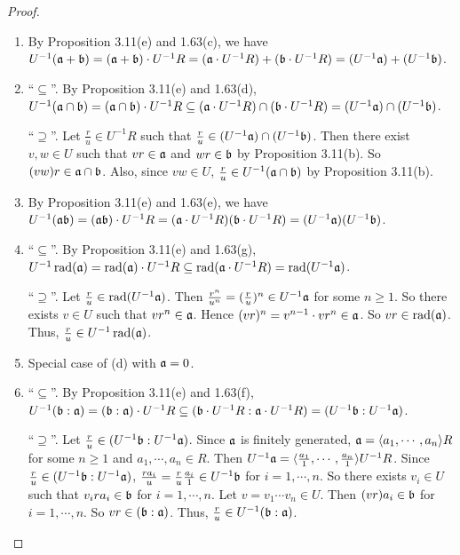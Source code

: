 \begin{proof}
    \begin{enumerate}
        \item By Proposition 3.11(e) and 1.63(c), we have $U^{-1}(\mathfrak{a}+\mathfrak{b}) = (\mathfrak{a}+\mathfrak{b}) \cdot U^{-1}R = (\mathfrak{a} \cdot U^{-1}R) + (\mathfrak{b} \cdot U^{-1}R) = (U^{-1}\mathfrak{a}) + (U^{-1}\mathfrak{b})$.
        \item ``$\subseteq$''. By Proposition 3.11(e) and 1.63(d), $U^{-1}(\mathfrak{a} \cap \mathfrak{b}) = (\mathfrak{a} \cap \mathfrak{b}) \cdot U^{-1}R \subseteq (\mathfrak{a} \cdot U^{-1}R) \cap (\mathfrak{b} \cdot U^{-1}R) = (U^{-1}\mathfrak{a}) \cap (U^{-1}\mathfrak{b})$. \par 
            ``$\supseteq$''. Let $\frac{r}{u} \in U^{-1}R$ such that $\frac{r}{u} \in (U^{-1}\mathfrak{a}) \cap (U^{-1}\mathfrak{b})$. Then there exist $v,w \in U$ such that $vr \in \mathfrak{a}$ and $wr \in \mathfrak{b}$ by Proposition 3.11(b). So $(vw)r \in \mathfrak{a} \cap \mathfrak{b}$. Also, since $vw \in U$, $\frac{r}{u} \in U^{-1}(\mathfrak{a} \cap \mathfrak{b})$ by Proposition 3.11(b). 
        \item By Proposition 3.11(e) and 1.63(e), we have $U^{-1}(\mathfrak{a}\mathfrak{b}) = (\mathfrak{a}\mathfrak{b}) \cdot U^{-1}R = (\mathfrak{a} \cdot U^{-1}R)(\mathfrak{b} \cdot U^{-1}R) = (U^{-1}\mathfrak{a})(U^{-1}\mathfrak{b})$.
        \item ``$\subseteq$''. By Proposition 3.11(e) and 1.63(g), $U^{-1} \operatorname{rad}(\mathfrak{a}) = \operatorname{rad}(\mathfrak{a}) \cdot U^{-1}R \subseteq \operatorname{rad}(\mathfrak{a} \cdot U^{-1}R) = \operatorname{rad}(U^{-1}\mathfrak{a})$. \par 
            ``$\supseteq$''. Let $\frac{r}{u} \in \operatorname{rad}(U^{-1}\mathfrak{a})$. Then $\frac{r^{n}}{u^{n}} = (\frac{r}{u})^{n} \in U^{-1}\mathfrak{a}$ for some $n \geq 1$. So there exists $v \in U$ such that $vr^{n} \in \mathfrak{a}$. Hence $(vr)^{n} = v^{n-1} \cdot vr^{n} \in \mathfrak{a}$. So $vr \in \operatorname{rad}(\mathfrak{a})$. Thus, $\frac{r}{u} \in U^{-1} \operatorname{rad}(\mathfrak{a})$.
        \item Special case of (d) with $\mathfrak{a} = 0$. 
        \item ``$\subseteq$''. By Proposition 3.11(e) and 1.63(f), $U^{-1}(\mathfrak{b}:\mathfrak{a}) = (\mathfrak{b}:\mathfrak{a}) \cdot U^{-1}R \subseteq (\mathfrak{b} \cdot U^{-1}R: \mathfrak{a} \cdot U^{-1}R) = (U^{-1}\mathfrak{b}:U^{-1}\mathfrak{a})$. \par 
            ``$\supseteq$''. Let $\frac{r}{u} \in (U^{-1}\mathfrak{b}:U^{-1}\mathfrak{a})$. Since $\mathfrak{a}$ is finitely generated, $\mathfrak{a} = \langle a_{1},\cdots,a_{n} \rangle R$ for some $n \geq 1$ and $a_{1},\cdots,a_{n} \in R$. Then $U^{-1}\mathfrak{a} = \langle \frac{a_{1}}{1},\cdots,\frac{a_{n}}{1} \rangle U^{-1}R$. Since $\frac{r}{u} \in (U^{-1}\mathfrak{b}:U^{-1}\mathfrak{a})$, $\frac{ra_{i}}{u} = \frac{r}{u} \frac{a_{i}}{1} \in U^{-1}\mathfrak{b}$ for $i = 1,\cdots,n$. So there exists $v_{i} \in U$ such that $v_{i} ra_{i} \in \mathfrak{b}$ for $i = 1,\cdots,n$. Let $v = v_{1} \cdots v_{n} \in U$. Then $(vr)a_{i} \in \mathfrak{b}$ for $i = 1,\cdots,n$. So $vr \in (\mathfrak{b}:\mathfrak{a})$. Thus, $\frac{r}{u} \in U^{-1}(\mathfrak{b}:\mathfrak{a})$.\qedhere
    \end{enumerate}
\end{proof}

